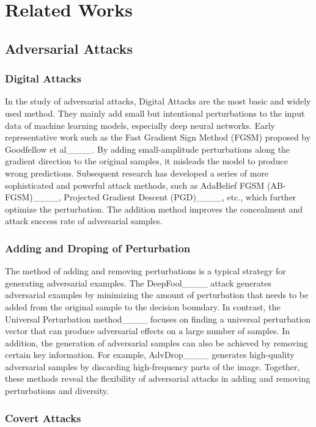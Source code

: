 \section{Related Works}
\subsection{Adversarial Attacks}

\subsubsection{Digital Attacks}

In the study of adversarial attacks, Digital Attacks are the most basic and widely used method. They mainly add small but intentional perturbations to the input data of machine learning models, especially deep neural networks. Early representative work such as the Fast Gradient Sign Method (FGSM) proposed by Goodfellow et al____. By adding small-amplitude perturbations along the gradient direction to the original samples, it misleads the model to produce wrong predictions. Subsequent research has developed a series of more sophisticated and powerful attack methods, such as AdaBelief FGSM (AB-FGSM)____, Projected Gradient Descent (PGD)____, etc., which further optimize the perturbation. The addition method improves the concealment and attack success rate of adversarial samples.

\subsubsection{Adding and Droping of Perturbation}

The method of adding and removing perturbations is a typical strategy for generating adversarial examples. The DeepFool____ attack generates adversarial examples by minimizing the amount of perturbation that needs to be added from the original sample to the decision boundary. In contrast, the Universal Perturbation method____ focuses on finding a universal perturbation vector that can produce adversarial effects on a large number of samples. In addition, the generation of adversarial samples can also be achieved by removing certain key information. For example, AdvDrop____ generates high-quality adversarial samples by discarding high-frequency parts of the image. Together, these methods reveal the flexibility of adversarial attacks in adding and removing perturbations and diversity.

\subsubsection{Covert Attacks}

